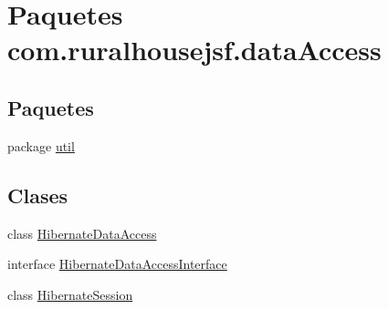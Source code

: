 \hypertarget{namespacecom_1_1ruralhousejsf_1_1data_access}{}\section{Paquetes com.\+ruralhousejsf.\+data\+Access}
\label{namespacecom_1_1ruralhousejsf_1_1data_access}
\subsection*{Paquetes}
\begin{DoxyCompactItemize}
\item 
package \mbox{\hyperlink{namespacecom_1_1ruralhousejsf_1_1data_access_1_1util}{util}}
\end{DoxyCompactItemize}
\subsection*{Clases}
\begin{DoxyCompactItemize}
\item 
class \mbox{\hyperlink{classcom_1_1ruralhousejsf_1_1data_access_1_1_hibernate_data_access}{Hibernate\+Data\+Access}}
\item 
interface \mbox{\hyperlink{interfacecom_1_1ruralhousejsf_1_1data_access_1_1_hibernate_data_access_interface}{Hibernate\+Data\+Access\+Interface}}
\item 
class \mbox{\hyperlink{classcom_1_1ruralhousejsf_1_1data_access_1_1_hibernate_session}{Hibernate\+Session}}
\end{DoxyCompactItemize}
